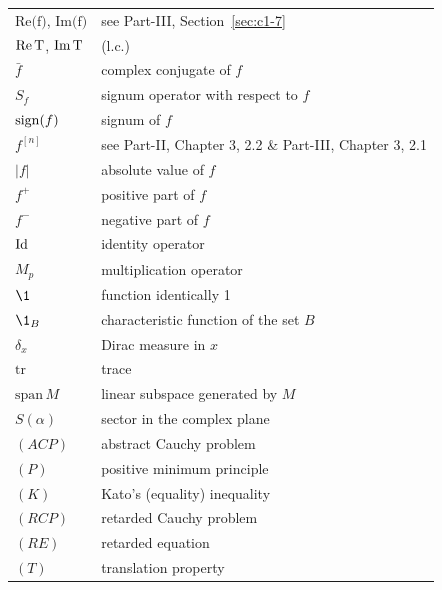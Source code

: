 \begin{longtable}{p{}p{}}
$\text{Re(f)}$, $\text{Im(f)}$ &  see Part-III, Section~\ref{sec:c1-7} \\ %
$\text{Re\,T}$, $\text{Im\,T}$ & (l.c.) \\ %
$\bar{f}$ & complex conjugate of $f$ \\ %
$S_{f}$ & signum operator with respect to $f$ \\ %
$\operatorname{sign}(f)$ & signum of $f$  \\ %
$f^{[n]}$ & see Part-II, Chapter 3, 2.2 \& Part-III, Chapter 3, 2.1 \\ %
$|f|$ & absolute value of $f$ \\ %
$f^{+}$ & positive part of $f$ \\ %
$f^{-}$ & negative part of $f$ \\ %
$\operatorname{Id}$ & identity operator \\ %
$M_{p}$ & multiplication operator \\ %
$\1$ & function identically 1 \\ %
$\1_{B}$ & characteristic function of the set $B$ \\ %
$\delta_{x}$ & Dirac measure in $x$ \\ %
$\text{tr}$ & trace \\ %
$\text{span}\,M$ & linear subspace generated by $M$ \\ %
$S(\alpha)$ & sector in the complex plane \\ %
$(ACP)$ & abstract Cauchy problem \\ %
$(P)$ & positive minimum principle \\ %
$(K)$ & Kato's (equality) inequality \\ %
$(RCP)$ & retarded Cauchy problem \\ %
$(RE)$ & retarded equation \\ %
$(T)$ & translation property \\ %
\end{longtable}
